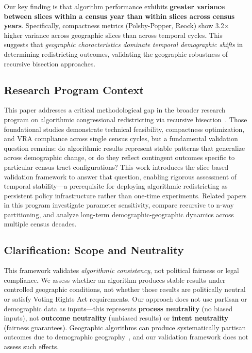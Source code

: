 Our key finding is that algorithm performance exhibits \textbf{greater variance between slices within a census year than within slices across census years}. Specifically, compactness metrics (Polsby-Popper, Reock) show 3.2× higher variance across geographic slices than across temporal cycles. This suggests that \textit{geographic characteristics dominate temporal demographic shifts} in determining redistricting outcomes, validating the geographic robustness of recursive bisection approaches.

\subsection{Research Program Context}

This paper addresses a critical methodological gap in the broader research program on algorithmic congressional redistricting via recursive bisection~\cite{della-libera-recursive-bisection,della-libera-edge-weighted,della-libera-vra-compliance}. Those foundational studies demonstrate technical feasibility, compactness optimization, and VRA compliance across single census cycles, but a fundamental validation question remains: do algorithmic results represent stable patterns that generalize across demographic change, or do they reflect contingent outcomes specific to particular census tract configurations? This work introduces the slice-based validation framework to answer that question, enabling rigorous assessment of temporal stability—a prerequisite for deploying algorithmic redistricting as persistent policy infrastructure rather than one-time experiments. Related papers in this program investigate parameter sensitivity, compare recursive to n-way partitioning, and analyze long-term demographic-geographic dynamics across multiple census decades.

\subsection{Clarification: Scope and Neutrality}

This framework validates \textit{algorithmic consistency}, not political fairness or legal compliance. We assess whether an algorithm produces stable results under controlled geographic conditions, not whether those results are politically neutral or satisfy Voting Rights Act requirements. Our approach does not use partisan or demographic data as inputs—this represents \textbf{process neutrality} (no biased inputs), not \textbf{outcome neutrality} (unbiased results) or \textbf{intent neutrality} (fairness guarantees). Geographic algorithms can produce systematically partisan outcomes due to demographic geography~\cite{chen2013}, and our validation framework does not assess such effects.

